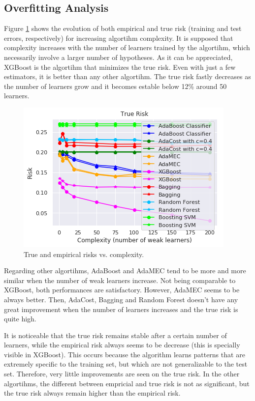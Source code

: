 \documentclass[conference]{IEEEtran}
\begin{document}
\subsection{Overfitting Analysis}

Figure \ref{fig:True_empirical_risk_complexity} shows the evolution of both empirical and true risk (training and test errors, respectively) for increasing algortihm complexity. It is supposed that complexity increases with the number of learners trained by the algortihm, which necessarily involve a larger number of hypotheses. As it can be appreciated, XGBoost is the algortihm that minimizes the true risk. Even with just a few estimators, it is better than any other algortihm. The true risk fastly decreases as the number of learners grow and it becomes estable below 12\% around 50 learners. 

\begin{figure}
	\includegraphics[scale=0.55]{True_empirical_risk_complexity}
	\centering
	\caption{True and empirical risks vs. complexity.}
	\label{fig:True_empirical_risk_complexity}
\end{figure}

Regarding other algortihms, AdaBoost and AdaMEC tend to be more and more similar when the number of weak learners increase. Not being comparable to XGBoost, both performances are satisfactory. However, AdaMEC seems to be always better. Then, AdaCost, Bagging and Random Forest doesn't have any great improvement when the number of learners increases and the true risk is quite high. 

It is noticeable that the true risk remains stable after a certain number of learners, while the empirical risk always seems to be decrease (this is specially visible in XGBoost). This occurs because the algorithm learns patterns that are extremely specific to the training set, but which are not generalizable to the test set. Therefore, very little improvements are seen on the true risk. In the other algortihms, the different between empricial and true risk is not as significant, but the true risk always remain higher than the empirical risk.
\end{document}
